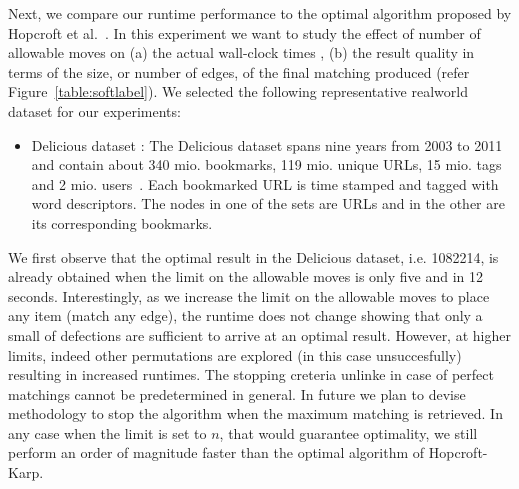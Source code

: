 Next, we compare our runtime performance to the optimal algorithm proposed by Hopcroft et al.~\cite{hopcroft1973n}. In this experiment we want to study the effect of number of allowable moves on (a) the actual wall-clock times , (b) the result quality in terms of the size, or number of edges, of the final matching produced (refer Figure~\ref{table:softlabel}). We selected the following representative realworld dataset for our experiments:

\begin{itemize}
  \item \textsf{Delicious dataset :} The \textsf{Delicious} dataset spans nine years from 2003 to 2011 and contain about 340 mio. bookmarks, 119 mio. unique URLs, 15 mio. tags and 2 mio. users~\cite{zubiaga2013harnessing}. Each bookmarked URL is time stamped and tagged with word descriptors. The nodes in one of the sets are URLs and in the other are its corresponding bookmarks.

\end{itemize}

We first observe that the optimal result in the \textsf{Delicious} dataset, i.e. 1082214, is already obtained when the limit on the allowable moves is only five and in 12 seconds. Interestingly, as we increase the limit on the allowable moves to place any item (match any edge), the runtime does not change showing that only a small of defections are sufficient to arrive at an optimal result. However, at higher limits, indeed other permutations are explored (in this case unsuccesfully) resulting in increased runtimes. The stopping creteria unlinke in case of perfect matchings cannot be predetermined in general. In future we plan to devise methodology to stop the algorithm when the maximum matching is retrieved. In any case when the limit is set to $n$, that would guarantee optimality, we still perform an order of magnitude faster than the optimal algorithm of Hopcroft-Karp. 




